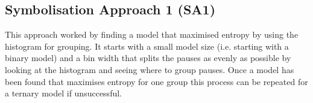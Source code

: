 %
%
%
%







\subsection{Symbolisation Approach 1 (SA1)}
This approach worked by finding a model that maximised entropy by using the histogram for grouping. It starts with a small model size (i.e. starting with a binary model) and a bin width that splits the pauses as evenly as possible by looking at the histogram and seeing where to group pauses. Once a model has been found that maximises entropy for one group this process can be repeated for a ternary model if unsuccessful. 

